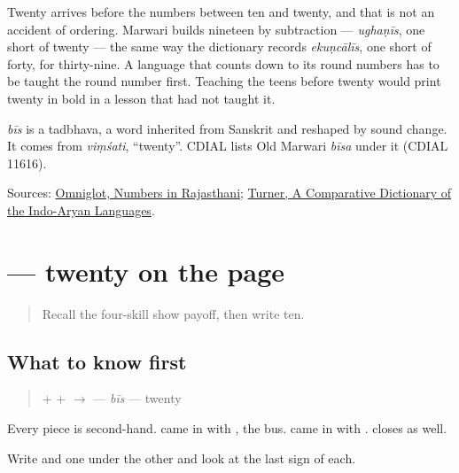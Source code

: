 Twenty arrives before the numbers between ten and twenty, and that is not an accident of ordering. Marwari builds nineteen by subtraction — \emph{ughaṇīs}, one short of twenty — the same way the dictionary records \emph{ekuṇcālīs}, one short of forty, for thirty-nine. A language that counts down to its round numbers has to be taught the round number first. Teaching the teens before twenty would print twenty in bold in a lesson that had not taught it.

\begin{cousinweb}
\emph{bīs} is a tadbhava, a word inherited from Sanskrit and reshaped by sound change. It comes from \emph{viṃśati}, \textquotedblleft{}twenty\textquotedblright{}. CDIAL lists Old Marwari \emph{bīsa} under it (CDIAL 11616).
\end{cousinweb}

\begin{tcolorbox}[breakable,colback=teal!4,colframe=teal!35!black,title={Before you move on}]
Sources: \href{https://www.omniglot.com/language/numbers/rajasthani.htm}{Omniglot, Numbers in Rajasthani}; \href{https://dsal.uchicago.edu/dictionaries/soas/}{Turner, A Comparative Dictionary of the Indo-Aryan Languages}.
\end{tcolorbox}
\section[\texorpdfstring{\mw{बीस} (bīs)}{बीस (bīs)}]{ — twenty on the page}

\label{lesson:MW-C34-bees}



\begin{quote}
Recall the four-skill show payoff, then write ten.
\end{quote}

\subsection*{What to know first}
\begin{quote}
\textbf{} + \textbf{} + \textbf{} $\to$ \textbf{} — \emph{bīs} — twenty
\end{quote}

Every piece is second-hand. \textbf{} came in with \textbf{}, the bus. \textbf{} came in with \textbf{}. \textbf{} closes \textbf{} as well.

Write \textbf{} and \textbf{} one under the other and look at the last sign of each.

